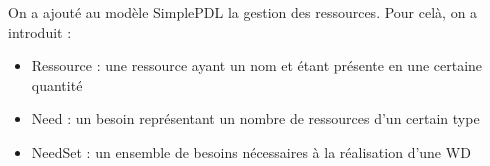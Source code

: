 On a ajouté au modèle SimplePDL la gestion des ressources.
Pour celà, on a introduit :
\begin{itemize}
\item Ressource : une ressource ayant un nom et étant présente en une certaine quantité
\item Need : un besoin représentant un nombre de ressources d'un certain type
\item NeedSet : un ensemble de besoins nécessaires à la réalisation d'une WD
\end{itemize}
